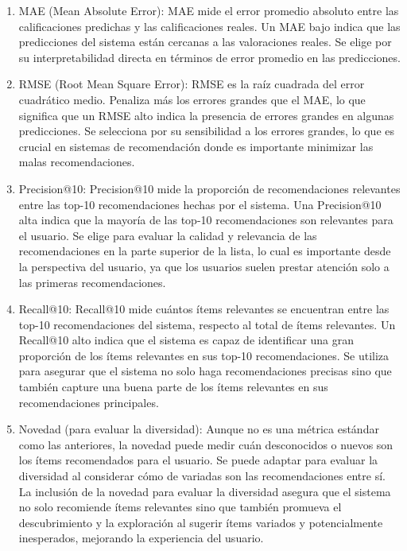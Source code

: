 \documentclass[runningheads]{llncs}
\begin{document}
        \begin{enumerate}
            \item MAE (Mean Absolute Error): MAE mide el error promedio absoluto entre las calificaciones predichas y las calificaciones reales. Un MAE bajo indica que las predicciones del sistema están cercanas a las valoraciones reales. Se elige por su interpretabilidad directa en términos de error promedio en las predicciones.
            \item RMSE (Root Mean Square Error): RMSE es la raíz cuadrada del error cuadrático medio. Penaliza más los errores grandes que el MAE, lo que significa que un RMSE alto indica la presencia de errores grandes en algunas predicciones. Se selecciona por su sensibilidad a los errores grandes, lo que es crucial en sistemas de recomendación donde es importante minimizar las malas recomendaciones.
            \item Precision@10: Precision@10 mide la proporción de recomendaciones relevantes entre las top-10 recomendaciones hechas por el sistema. Una Precision@10 alta indica que la mayoría de las top-10 recomendaciones son relevantes para el usuario. Se elige para evaluar la calidad y relevancia de las recomendaciones en la parte superior de la lista, lo cual es importante desde la perspectiva del usuario, ya que los usuarios suelen prestar atención solo a las primeras recomendaciones.
            \item Recall@10: Recall@10 mide cuántos ítems relevantes se encuentran entre las top-10 recomendaciones del sistema, respecto al total de ítems relevantes. Un Recall@10 alto indica que el sistema es capaz de identificar una gran proporción de los ítems relevantes en sus top-10 recomendaciones. Se utiliza para asegurar que el sistema no solo haga recomendaciones precisas sino que también capture una buena parte de los ítems relevantes en sus recomendaciones principales.
            \item Novedad (para evaluar la diversidad): Aunque no es una métrica estándar como las anteriores, la novedad puede medir cuán desconocidos o nuevos son los ítems recomendados para el usuario. Se puede adaptar para evaluar la diversidad al considerar cómo de variadas son las recomendaciones entre sí. La inclusión de la novedad para evaluar la diversidad asegura que el sistema no solo recomiende ítems relevantes sino que también promueva el descubrimiento y la exploración al sugerir ítems variados y potencialmente inesperados, mejorando la experiencia del usuario.
        \end{enumerate}
\end{document}
